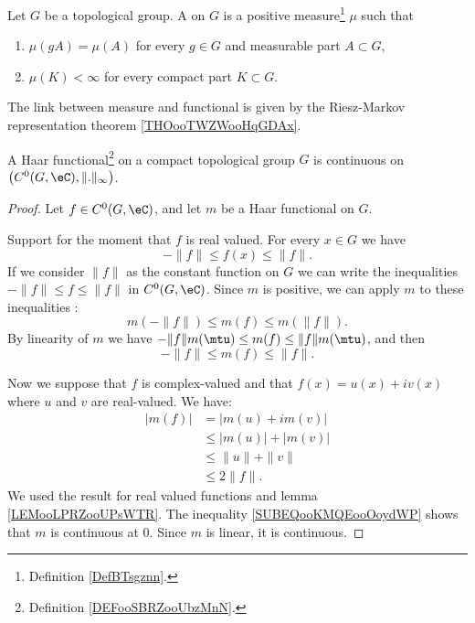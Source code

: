 \begin{definition}      \label{DEFooXIKEooWOxHlr}
	Let \( G\) be a topological group. A  on \( G\) is a positive measure\footnote{Definition \ref{DefBTsgznn}.} \( \mu\) such that
	\begin{enumerate}
		\item
		      \( \mu(gA)=\mu(A)\) for every \( g\in G\) and measurable part \( A\subset G\),
		\item       \label{ITEMooNETPooYTwhBx}
		      \( \mu(K)<\infty\) for every compact part \( K\subset G\).
	\end{enumerate}
\end{definition}

The link between measure and functional is given by the Riesz-Markov representation theorem \ref{THOooTWZWooHqGDAx}.

\begin{lemma}     \label{LEMooRWOFooDOSUYo}
	A Haar functional\footnote{Definition \ref{DEFooSBRZooUbzMnN}.} on a compact topological group \( G\) is continuous on \( \big( C^0(G,\eC), \| . \|_{\infty} \big)\).
\end{lemma}

\begin{proof}
	Let \( f\in C^0(G,\eC)\), and let \( m\) be a Haar functional on \( G\).

	Support for the moment that \( f\) is real valued. For every \( x\in G\) we have
	\begin{equation}
		-\| f \|\leq f(x)\leq \| f \|.
	\end{equation}
	If we consider \( \| f \|\) as the constant function on \( G\) we can write the inequalities \( -\| f \|\leq f\leq \| f \|\) in \( C^0(G,\eC)\).  Since \( m\) is positive, we can apply \( m\) to these inequalities :
	\begin{equation}
		m(-\| f \|)\leq m(f)\leq m(\| f \|).
	\end{equation}
	By linearity of \( m\) we have \( -\| f \|m(\mtu)\leq m(f)\leq \| f \|m(\mtu)\), and then
	\begin{equation}
		-\| f \|\leq m(f)\leq \| f \|.
	\end{equation}

	Now we suppose that \( f\) is complex-valued and that \( f(x)=u(x)+iv(x)\) where \( u\) and \( v\) are real-valued. We have:
	\begin{subequations}        \label{SUBEQooKMQEooOoydWP}
		\begin{align}
			| m(f) | & =| m(u)+im(v) |        \\
			         & \leq | m(u) |+| m(v) | \\
			         & \leq \| u \|+\| v \|   \\
			         & \leq 2\| f \|.
		\end{align}
	\end{subequations}
	We used the result for real valued functions and lemma \ref{LEMooLPRZooUPsWTR}. The inequality \eqref{SUBEQooKMQEooOoydWP} shows that \( m\) is continuous at \( 0\). Since \( m\) is linear, it is continuous.
\end{proof}

